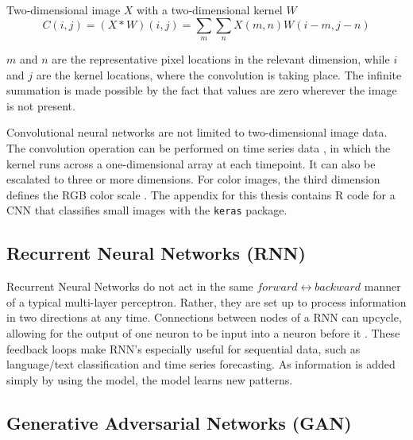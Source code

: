 Two-dimensional image \(X\) with a two-dimensional kernel \(W\) \[
C(i,j) = (X * W)(i,j) = \sum_m \sum_n X(m,n)W(i-m,j-n)
\]

\(m\) and \(n\) are the representative pixel locations in the relevant
dimension, while \(i\) and \(j\) are the kernel locations, where the
convolution is taking place. The infinite summation is made possible by
the fact that values are zero wherever the image is not present.

Convolutional neural networks are not limited to two-dimensional image data.  The convolution operation can be performed on time series data \cite{Goodfellow-et-al-2016}, in which the kernel runs across a one-dimensional array at each timepoint.  It can also be escalated to three or more dimensions.  For color images, the third dimension defines the RGB color scale \cite{rai}.  The appendix for this thesis contains R code for a CNN that classifies small images with the \texttt{keras} package.



\hypertarget{recurrent-neural-networks-rnn}{%
\subsection{Recurrent Neural Networks
(RNN)}\label{recurrent-neural-networks-rnn}}

Recurrent Neural Networks do not act in the same $forward \leftrightarrow backward$ manner of a typical multi-layer perceptron.  Rather, they are set up to process information in two directions at any time.  Connections between nodes of a RNN can upcycle, allowing for the output of one neuron to be input into a neuron before it
\cite{medsker2001recurrent}.  These feedback loops make RNN's especially useful for sequential data, such as language/text classification and time series forecasting.  As information is added simply by using the model, the model learns new patterns.




\subsection{Generative Adversarial Networks
(GAN)}\label{generative-adversarial-networks-gan}

